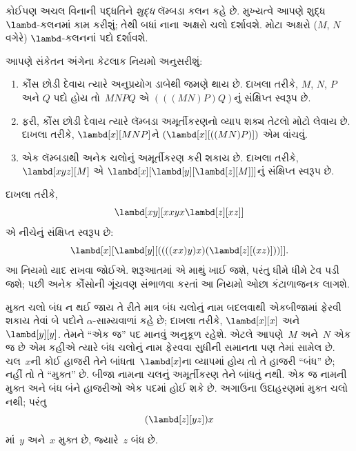 કોઈપણ અચલ વિનાની પદ્ધતિને \emph{શુદ્ધ} લૅમ્બડા કલન કહે છે.
મુખ્યત્વે આપણે શુદ્ધ~$\lambd$-કલનમાં કામ કરીશું; તેથી બધાં નાના
અક્ષરો ચલો દર્શાવશે. મોટા અક્ષરો ($M$, $N$ વગેરે) $\lambd$-કલનનાં
પદો દર્શાવશે.

આપણે સંકેતન અંગેના કેટલાક નિયમો અનુસરીશું:

\begin{conv}
\begin{enumerate}
\item કૌંસ છોડી દેવાય ત્યારે અનુપ્રયોગ ડાબેથી જમણે થાય છે.
  દાખલા તરીકે, $M$, $N$, $P$ અને $Q$ પદો હોય તો~$MNPQ$ એ
  $(((MN)P)Q)$નું સંક્ષિપ્ત સ્વરૂપ છે.
\item ફરી, કૌંસ છોડી દેવાય ત્યારે લૅમ્બડા અમૂર્તીકરણનો વ્યાપ
  શક્ય તેટલો મોટો લેવાય છે. દાખલા તરીકે, $\lambd[x][MNP]$ને
  $(\lambd[x][((MN)P)])$ એમ વાંચવું.
\item એક લૅમ્બડાથી અનેક ચલોનું અમૂર્તીકરણ કરી શકાય છે.
  દાખલા તરીકે, $\lambd[xyz][M]$ એ
  $\lambd[x][\lambd[y][\lambd[z][M]]]$નું સંક્ષિપ્ત સ્વરૂપ છે.
\end{enumerate}
\end{conv}

દાખલા તરીકે,
\[
\lambd[xy][xxyx \lambd[z][xz]]
\]
એ નીચેનું સંક્ષિપ્ત સ્વરૂપ છે:
\[
\lambd[x][\lambd[y][((((xx)y)x)(\lambd[z][(xz)]))]].
\]
આ નિયમો યાદ રાખવા જોઈએ. શરૂઆતમાં એ માથું ખાઈ જશે, પરંતુ
ધીમે ધીમે ટેવ પડી જશે; પછી અનેક કૌંસોની ગૂંચવણ સંભાળવા કરતાં
આ નિયમો ઓછા કંટાળાજનક લાગશે.

મુક્ત ચલો બંધ ન થઈ જાય તે રીતે માત્ર બંધ ચલોનું નામ બદલવાથી
એકબીજામાં ફેરવી શકાય તેવાં બે પદોને
$\alpha$-સામ્યવાળાં કહે છે; દાખલા તરીકે, $\lambd[x][x]$ અને
$\lambd[y][y]$. તેમને ``એક જ'' પદ માનવું અનુકૂળ રહેશે.
એટલે આપણે~$M$ અને~$N$ એક જ છે એમ કહીએ ત્યારે બંધ ચલોનું નામ
ફેરવવા સુધીની સમાનતા પણ તેમાં સામેલ છે. ચલ~$x$ની કોઈ હાજરી
તેને બાંધતા~$\lambd[x]$ના વ્યાપમાં હોય તો તે હાજરી ``બંધ'' છે;
નહીં તો તે ``મુક્ત'' છે. બીજા નામના ચલનું અમૂર્તીકરણ તેને બાંધતું નથી.
એક જ નામની મુક્ત અને બંધ બંને હાજરીઓ એક પદમાં હોઈ શકે છે.
અગાઉના ઉદાહરણમાં
મુક્ત ચલો નથી; પરંતુ
\[
(\lambd[z][yz])x
\]
માં~$y$ અને~$x$ મુક્ત છે, જ્યારે~$z$ બંધ છે.
\endgroup


\begingroup
\makeatletter{}\makeatother

